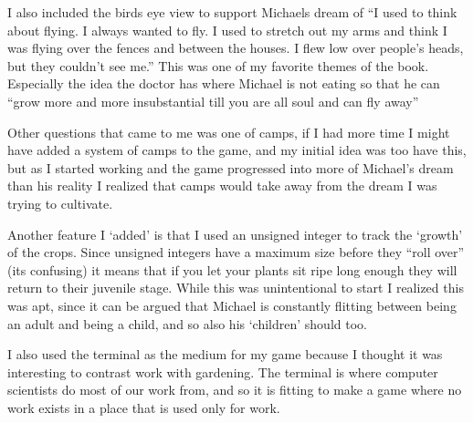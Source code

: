 \documentclass{article}
\begin{document}
I also included the birds eye view to support Michaels dream of ``I used to think about flying. I always wanted to fly. I used to stretch out my arms and think I was flying over the fences and between the houses. I flew low over people's heads, but they couldn't see me.'' This was one of my favorite themes of the book. Especially the idea the doctor has where Michael is not eating so that he can ``grow more and more insubstantial till you are all soul and can fly away'' 

Other questions that came to me was one of camps, if I had more time I might have added a system of camps to the game, and my initial idea was too have this, but as I started working and the game progressed into more of Michael's dream than his reality I realized that camps would take away from the dream I was trying to cultivate. 

Another feature I `added' is that I used an unsigned integer to track the `growth' of the crops. Since unsigned integers have a maximum size before they ``roll over'' (its confusing) it means that if you let your plants sit ripe long enough they will return to their juvenile stage. While this was unintentional to start I realized this was apt, since it can be argued that Michael is constantly flitting between being an adult and being a child, and so also his `children' should too.

I also used the terminal as the medium for my game because I thought it was interesting to contrast work with gardening. The terminal is where computer scientists do most of our work from, and so it is fitting to make a game where no work exists in a place that is used only for work. 
\end{document}
